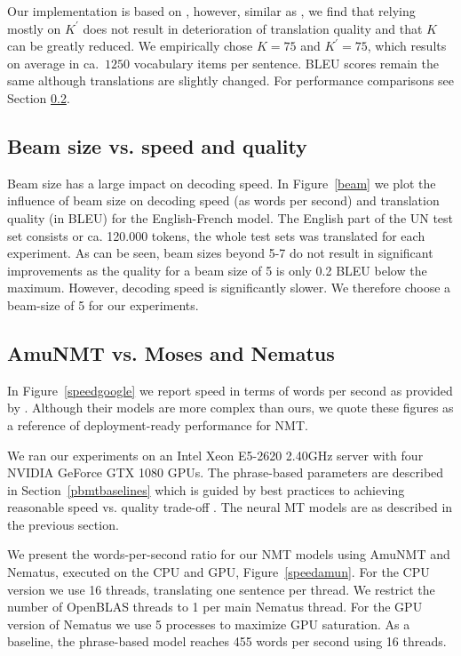 \documentclass[11pt]{article}
\begin{document}
Our implementation is based on \cite{DBLP:conf/acl/JeanCMB15}, however, similar as \cite{DBLP:conf/acl/MiWI16}, we find that relying mostly on $K^{\prime}$  does not result in  deterioration of translation quality and that $K$ can be greatly reduced. We empirically chose $K=75$ and $K^{\prime}=75$, which results on average in ca.~$1250$ vocabulary items per sentence.  
BLEU scores remain the same although translations are slightly changed. For performance comparisons see Section \ref{comparespeed}.

\subsection{Beam size vs. speed and quality}

Beam size has a large impact on decoding speed. In Figure~\ref{beam} we plot the influence of beam size on decoding speed (as words per second) and translation quality (in BLEU) for the English-French model. The English part of the UN test set consists or ca. 120.000 tokens, the whole test sets was translated for each experiment. As can be seen, beam sizes beyond 5-7 do not result in significant improvements as the quality for a beam size of 5 is only 0.2 BLEU below the maximum. However, decoding speed is significantly slower. We therefore choose a beam-size of 5 for our experiments.  

\subsection{AmuNMT vs. Moses and Nematus}
\label{comparespeed}
In Figure~\ref{speedgoogle} we report speed in terms of words per second as provided by \cite{google}. Although their models are more complex than ours, we quote these figures as a reference of deployment-ready performance for NMT. 

We ran our experiments on an Intel Xeon E5-2620 2.40GHz server with four NVIDIA GeForce GTX 1080 GPUs. The phrase-based parameters are described in Section~\ref{pbmtbaselines} which is guided by best practices to achieving reasonable speed vs. quality trade-off \cite{junczys_mtsummit_2013}. The neural MT models are as described in the previous section.

We present the words-per-second ratio for our NMT models using AmuNMT and Nematus, executed on the CPU and GPU, Figure~\ref{speedamun}. For the CPU version we use 16 threads, translating one sentence per thread. We restrict the number of OpenBLAS threads to 1 per main Nematus thread. For the GPU version of Nematus we use 5 processes to maximize GPU saturation. As a baseline, the phrase-based model reaches 455 words per second using 16 threads. 
\end{document}
